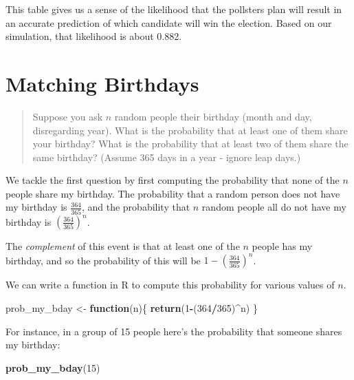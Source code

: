 \documentclass[
]{book}
\newenvironment{Shaded}{\begin{snugshade}}{\end{snugshade}}
\newcommand{\ControlFlowTok}[1]{\textcolor[rgb]{0.13,0.29,0.53}{\textbf{#1}}}
\newcommand{\DecValTok}[1]{\textcolor[rgb]{0.00,0.00,0.81}{#1}}
\newcommand{\FunctionTok}[1]{\textcolor[rgb]{0.13,0.29,0.53}{\textbf{#1}}}
\newcommand{\NormalTok}[1]{#1}
\newcommand{\OtherTok}[1]{\textcolor[rgb]{0.56,0.35,0.01}{#1}}
\newcommand{\SpecialCharTok}[1]{\textcolor[rgb]{0.81,0.36,0.00}{\textbf{#1}}}
\theoremstyle{definition}
\theoremstyle{definition}
\theoremstyle{definition}
\theoremstyle{definition}
\theoremstyle{remark}
\begin{document}
This table gives us a sense of the likelihood that the pollsters plan will result in an accurate prediction of which candidate will win the election. Based on our simulation, that likelihood is about 0.882.

\section{Matching Birthdays}\label{same-birthday-R}

\begin{quote}
Suppose you ask \(n\) random people their birthday (month and day, disregarding year). What is the probability that at least one of them share your birthday? What is the probability that at least two of them share the same birthday? (Assume 365 days in a year - ignore leap days.)
\end{quote}

We tackle the first question by first computing the probability that none of the \(n\) people share my birthday. The probability that a random person does not have my birthday is \(\frac{364}{365}\), and the probability that \(n\) random people all do not have my birthday is \(\left(\frac{364}{365}\right)^n\).

The \emph{complement} of this event is that at least one of the \(n\) people has my birthday, and so the probability of this will be \(1- \left(\frac{364}{365}\right)^n\).

We can write a function in R to compute this probability for various values of \(n\).

\begin{Shaded}
\begin{Highlighting}[]
\NormalTok{prob\_my\_bday }\OtherTok{\textless{}{-}} \ControlFlowTok{function}\NormalTok{(n)\{}
  \FunctionTok{return}\NormalTok{(}\DecValTok{1}\SpecialCharTok{{-}}\NormalTok{(}\DecValTok{364}\SpecialCharTok{/}\DecValTok{365}\NormalTok{)}\SpecialCharTok{\^{}}\NormalTok{n)}
\NormalTok{\}}
\end{Highlighting}
\end{Shaded}

For instance, in a group of 15 people here's the probability that someone shares my birthday:

\begin{Shaded}
\begin{Highlighting}[]
\FunctionTok{prob\_my\_bday}\NormalTok{(}\DecValTok{15}\NormalTok{)}
\end{Highlighting}
\end{Shaded}
\end{document}
